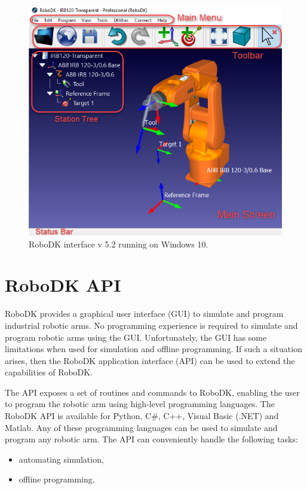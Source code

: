 \begin{figure}[h]
    \centering
    \includegraphics[width=0.9\linewidth]{img/robodk_interface.png}
    \caption{RoboDK interface v 5.2 running on Windows 10.}
    \label{fig:robodkinterface}
\end{figure}

\section{RoboDK API}

RoboDK provides a graphical user interface (GUI) to simulate and program industrial robotic arms. No programming experience is required to simulate and program robotic arms using the GUI. Unfortunately, the GUI has some limitations when used for simulation and offline programming. If such a situation arises, then the RoboDK application interface (API) can be used to extend the capabilities of RoboDK.

The API exposes a set of routines and commands to RoboDK, enabling the user to program the robotic arm using high-level programming languages. The RoboDK API is available for Python, C\#, C++, Visual Basic (.NET) and Matlab. Any of these programming languages can be used to simulate and program any robotic arm. The API can conveniently handle the following tasks:

\begin{itemize}
    \item automating simulation,
    \item offline programming.
\end{itemize}

